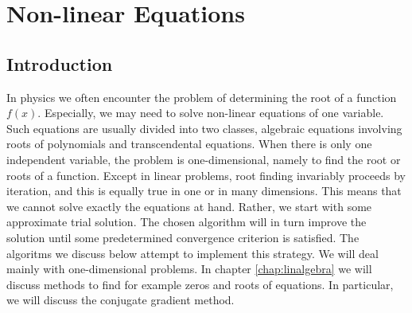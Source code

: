 
\chapter{Non-linear Equations}\label{chap:nonlinear} 

\section{Introduction}
In physics we often encounter the problem of determining the root of a function $f(x)$. 
Especially, we may need to solve non-linear equations of one variable. 
Such equations are usually divided into two classes, algebraic equations involving
roots of polynomials and transcendental equations.
When there is only one independent variable,
the problem is one-dimensional, namely to find the root or roots of a function.
Except in linear problems, root finding invariably proceeds by iteration, and
this is equally true in one or in many dimensions. 
This means that we cannot solve exactly the equations at hand. Rather, we 
start with some approximate
trial solution. The chosen algorithm will in turn improve the solution until some predetermined
convergence criterion is satisfied. The algoritms we discuss below attempt to implement
this strategy. We will deal mainly with 
one-dimensional problems.
In chapter \ref{chap:linalgebra} we will discuss methods to find for example zeros and roots of equations. In particular, we will discuss the conjugate gradient method. 
